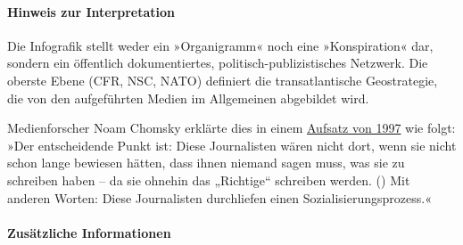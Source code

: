 \hypertarget{hinweis-zur-interpretation}{%
\paragraph{Hinweis zur
Interpretation}\label{hinweis-zur-interpretation}}

Die Infografik stellt weder ein »Organigramm« noch eine »Konspiration«
dar, sondern ein öffentlich dokumentiertes, politisch-publizistisches
Netzwerk. Die oberste Ebene (CFR, NSC, NATO) definiert die
transatlantische Geostrategie, die von den aufgeführten Medien im
Allgemeinen abgebildet wird.

Medienforscher Noam Chomsky erklärte dies in einem
\href{https://chomsky.info/199710__/}{Aufsatz von 1997} wie folgt: »Der
entscheidende Punkt ist: Diese Journalisten wären nicht dort, wenn sie
nicht schon lange bewiesen hätten, dass ihnen niemand sagen muss, was
sie zu schreiben haben -- da sie ohnehin das „Richtige`` schreiben
werden. () Mit anderen Worten: Diese Journalisten durchliefen einen
Sozialisierungsprozess.«

\hypertarget{zusuxe4tzliche-informationen}{%
\paragraph{Zusätzliche
Informationen}\label{zusuxe4tzliche-informationen}}

